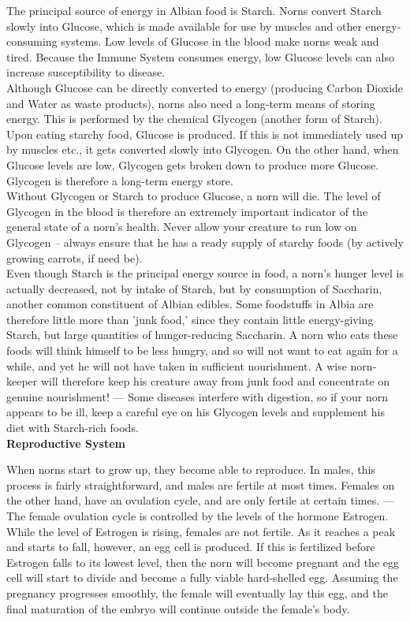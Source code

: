 \documentclass[11pt,twoside,a4paper]{article}
\begin{document}
The principal source of energy in Albian food is Starch. Norns convert Starch slowly into Glucose, which is made available for use by muscles and other energy-consuming systems. Low levels of Glucose in the blood make norns weak and tired. Because the Immune System consumes energy, low Glucose levels can also increase susceptibility to disease. ~\\

Although Glucose can be directly converted to energy (producing Carbon Dioxide and Water as waste products), norns also need a long-term means of storing energy. This is performed by the chemical Glycogen (another form of Starch). Upon eating starchy food, Glucose is produced. If this is not immediately used up by muscles etc., it gets converted slowly into Glycogen. On the other hand, when Glucose levels are low, Glycogen gets broken down to produce more Glucose. Glycogen is therefore a long-term energy store. ~\\

Without Glycogen or Starch to produce Glucose, a norn will die. The level of Glycogen in the blood is therefore an extremely important indicator of the general state of a norn's health. Never allow your creature to run low on Glycogen -- always ensure that he has a ready supply of starchy foods (by actively growing carrots, if need be). ~\\

Even though Starch is the principal energy source in food, a norn's hunger level is actually decreased, not by intake of Starch, but by consumption of Saccharin, another common constituent of Albian edibles. Some foodstuffs in Albia are therefore little more than 'junk food,' since they contain little energy-giving Starch, but large quantities of hunger-reducing Saccharin. A norn who eats these foods will think himself to be less hungry, and so will not want to eat again for a while, and yet he will not have taken in sufficient nourishment. A wise norn-keeper will therefore keep his creature away from junk food and concentrate on genuine nourishment! --- Some diseases interfere with digestion, so if your norn appears to be ill, keep a careful eye on his Glycogen levels and supplement his diet with Starch-rich foods. ~\\

\textbf{Reproductive System} %

When norns start to grow up, they become able to reproduce. In males, this process is fairly straightforward, and males are fertile at most times. Females on the other hand, have an ovulation cycle, and are only fertile at certain times. --- The female ovulation cycle is controlled by the levels of the hormone Estrogen. While the level of Estrogen is rising, females are not fertile. As it reaches a peak and starts to fall, however, an egg cell is produced. If this is fertilized before Estrogen falls to its lowest level, then the norn will become pregnant and the egg cell will start to divide and become a fully viable hard-shelled egg. Assuming the pregnancy progresses smoothly, the female will eventually lay this egg, and the final maturation of the embryo will continue outside the female's body. ~\\
\end{document}
